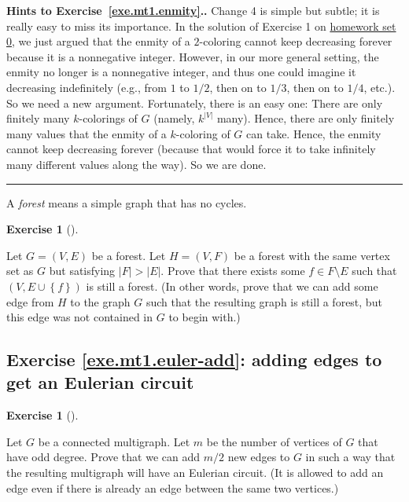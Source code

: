 \documentclass[numbers=enddot,12pt,final,onecolumn,notitlepage]{scrartcl}%
\newcounter{exer}
\theoremstyle{definition}
\newtheorem{exmp}[exer]{Exercise}
\newenvironment{exercise}[1][]
{\begin{exmp}[#1]\begin{leftbar}}
{\end{leftbar}\end{exmp}}
\newenvironment{proof}[1][Proof]{\noindent\textbf{#1.} }{\ \rule{0.5em}{0.5em}}
\newenvironment{noncompile}{}{}
\newcommand{\set}[1]{\left\{ #1 \right\}}
\newcommand{\abs}[1]{\left| #1 \right|}
\newcommand{\tup}[1]{\left( #1 \right)}
\begin{document}
\begin{proof}[Hints to Exercise~\ref{exe.mt1.enmity}.]
Change 4 is simple but subtle; it is really easy to miss its
importance. In the solution of Exercise 1 on
\href{http://www.cip.ifi.lmu.de/~grinberg/t/17s/hw0s.pdf}{homework set 0},
we just argued that the enmity of a $2$-coloring cannot keep
decreasing forever because it is a nonnegative integer. However, in
our more general setting, the enmity no longer is a nonnegative
integer, and thus one could imagine it decreasing indefinitely
(e.g., from $1$ to
$1/2$, then on to $1/3$, then on to $1/4$, etc.). So we need a new
argument. Fortunately, there is an easy one: There are only finitely
many $k$-colorings of $G$ (namely, $k^{\abs{V}}$ many). Hence, there
are only finitely many values that the enmity of a $k$-coloring of $G$
can take. Hence, the enmity cannot keep decreasing forever (because
that would force it to take infinitely many different values along
the way). So we are done.
\end{proof}

\begin{noncompile}
A \textit{forest} means a simple graph that has no cycles.

\begin{exercise} \label{exe.mt1.forests-matroid}
Let $G = \tup{V, E}$ be a forest. Let $H = \tup{V, F}$ be a forest
with the same vertex set as $G$ but satisfying $\abs{F} > \abs{E}$.
Prove that there exists some $f \in F \setminus E$ such that
$\tup{V, E \cup \set{f}}$ is still a forest. (In other words, prove
that we can add some edge from $H$ to the graph $G$ such that the
resulting graph is still a forest, but this edge was not contained in
$G$ to begin with.)
\end{exercise}
\end{noncompile}

\subsection{Exercise \ref{exe.mt1.euler-add}: adding edges to get an
Eulerian circuit}

\begin{exercise} \label{exe.mt1.euler-add}
Let $G$ be a connected multigraph. Let $m$ be the number of vertices
of $G$ that have odd degree. Prove that we can add $m/2$ new edges to
$G$ in such a way that the resulting multigraph will have an Eulerian
circuit. (It is allowed to add an edge even if there is already an
edge between the same two vertices.)
\end{exercise}
\end{document}

